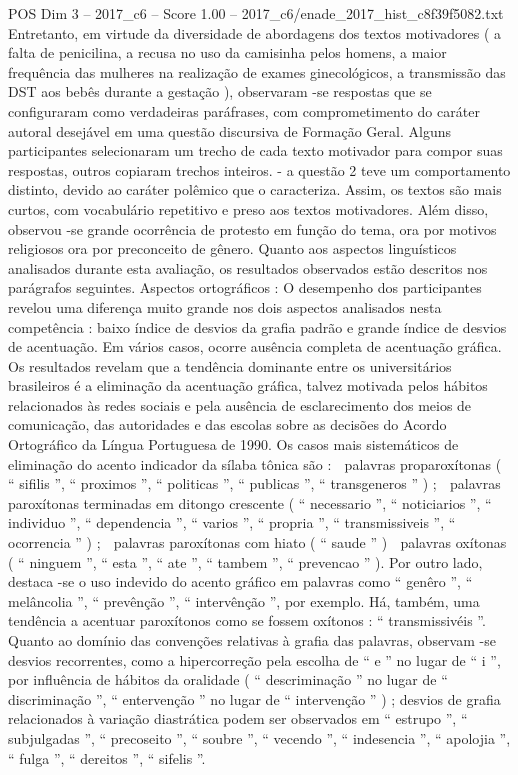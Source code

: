 \begin{textsample}{POS Dim 3 – 2017\_c6 – Score 1.00 – 2017\_c6/enade\_2017\_hist\_c8f39f5082.txt}
Entretanto, em virtude da diversidade de abordagens dos textos motivadores ( a falta de penicilina, a recusa no uso da camisinha pelos homens, a maior frequência das mulheres na realização de exames ginecológicos, a transmissão das DST aos bebês durante a gestação ), observaram -se respostas que se configuraram como verdadeiras paráfrases, com comprometimento do caráter autoral desejável em uma questão discursiva de Formação Geral.
Alguns participantes selecionaram um trecho de cada texto motivador para compor suas respostas, outros copiaram trechos inteiros. - a questão 2 teve um comportamento distinto, devido ao caráter polêmico que o caracteriza.
Assim, os textos são mais curtos, com vocabulário repetitivo e preso aos textos motivadores.
Além disso, observou -se grande ocorrência de protesto em função do tema, ora por motivos religiosos ora por preconceito de gênero.
Quanto aos aspectos linguísticos analisados durante esta avaliação, os resultados observados estão descritos nos parágrafos seguintes.
Aspectos ortográficos : O desempenho dos participantes revelou uma diferença muito grande nos dois aspectos analisados nesta competência : baixo índice de desvios da grafia padrão e grande índice de desvios de acentuação.
Em vários casos, ocorre ausência completa de acentuação gráfica.
Os resultados revelam que a tendência dominante entre os universitários brasileiros é a eliminação da acentuação gráfica, talvez motivada pelos hábitos relacionados às redes sociais e pela ausência de esclarecimento dos meios de comunicação, das autoridades e das escolas sobre as decisões do Acordo Ortográfico da Língua Portuguesa de 1990.
Os casos mais sistemáticos de eliminação do acento indicador da sílaba tônica são :  palavras proparoxítonas ( “ sifilis ”, “ proximos ”, “ politicas ”, “ publicas ”, “ transgeneros ” ) ;  palavras paroxítonas terminadas em ditongo crescente ( “ necessario ”, “ noticiarios ”, “ individuo ”, “ dependencia ”, “ varios ”, “ propria ”, “ transmissiveis ”, “ ocorrencia ” ) ;  palavras paroxítonas com hiato ( “ saude ” )  palavras oxítonas ( “ ninguem ”, “ esta ”, “ ate ”, “ tambem ”, “ prevencao ” ).
Por outro lado, destaca -se o uso indevido do acento gráfico em palavras como “ genêro ”, “ melâncolia ”, “ prevênção ”, “ intervênção ”, por exemplo.
Há, também, uma tendência a acentuar paroxítonos como se fossem oxítonos : “ transmissivéis ”.
Quanto ao domínio das convenções relativas à grafia das palavras, observam -se desvios recorrentes, como a hipercorreção pela escolha de “ e ” no lugar de “ i ”, por influência de hábitos da oralidade ( “ descriminação ” no lugar de “ discriminação ”, “ entervenção ” no lugar de “ intervenção ” ) ; desvios de grafia relacionados à variação diastrática podem ser observados em “ estrupo ”, “ subjulgadas ”, “ precoseito ”, “ soubre ”, “ vecendo ”, “ indesencia ”, “ apolojia ”, “ fulga ”, “ dereitos ”, “ sifelis ”.

\end{textsample}
